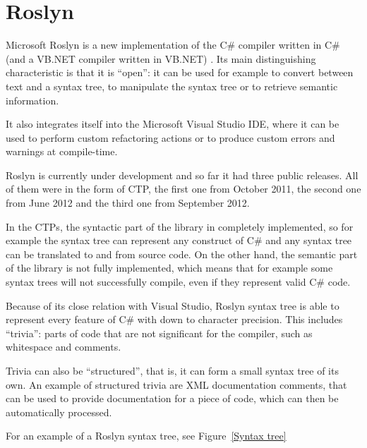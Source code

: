 \section{Roslyn}
\label{roslyn}

Microsoft Roslyn is a new implementation of the C\# compiler written in C\#
(and a \ac{VB.NET} compiler written in \ac{VB.NET}) \cite{roslyn}.
Its main distinguishing characteristic is that it is “open”:
it can be used for example to convert between text and a syntax tree,
to manipulate the syntax tree or to retrieve semantic information.

It also integrates itself into the Microsoft Visual Studio \ac{IDE},
where it can be used to perform
custom refactoring actions or to produce custom errors and warnings at compile-time.

Roslyn is currently under development and so far it had three public releases.
All of them were in the form of \ac{CTP},
the first one from October 2011, the second one from June 2012 and the third one from September 2012.

In the \acp{CTP}, the syntactic part of the library in completely implemented,
so for example the syntax tree can represent any construct of C\#
and any syntax tree can be translated to and from source code.
On the other hand, the semantic part of the library is not fully implemented,
which means that for example some syntax trees will not successfully compile,
even if they represent valid C\# code.

Because of its close relation with Visual Studio,
Roslyn syntax tree is able to represent every feature of C\# with down to character precision.
This includes “trivia”: parts of code that are not significant for the compiler,
such as whitespace and comments.

Trivia can also be “structured”, that is, it can form a small syntax tree of its own.
An example of structured trivia are \ac{XML} documentation comments,
that can be used to provide documentation for a piece of code,
which can then be automatically processed.

For an example of a Roslyn syntax tree, see Figure~\ref{Syntax tree}

